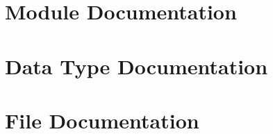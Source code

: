 \documentclass[twoside]{book}
\newcommand{\+}{\discretionary{\mbox{\scriptsize$\hookleftarrow$}}{}{}}
\newcommand{\clearemptydoublepage}{%
  \newpage{\pagestyle{empty}\cleardoublepage}%
}
\begin{document}
\chapter{Module Documentation}









\chapter{Data Type Documentation}















\chapter{File Documentation}














\newpage
{}
\clearemptydoublepage
{}



\backmatter
\newpage
{}
\clearemptydoublepage
{}
\printindex
\end{document}
